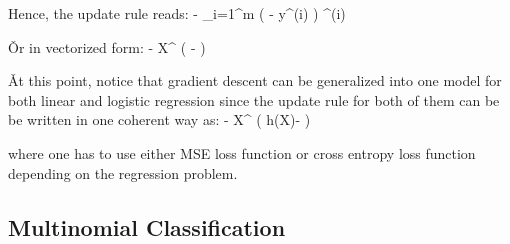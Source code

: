 Hence, the update rule reads:
\bse
{} \coloneqq {} -  \sum_{i=1}^{m}
\Big(  - y^{(i)} \Big) \cdot {}^{(i)}
\ese

\v

Or in vectorized form:
\bse
{} \coloneqq {} -  X^{\intercal}
\Big( - \Big)
\ese

\v

At this point, notice that gradient descent can be generalized into one model for both linear and logistic regression
since the update rule for both of them can be be written in one coherent way as:
\bse
{} \coloneqq {} -  X^{\intercal} \Big( h(X)- \Big)
\ese

where one has to use either MSE loss function or cross entropy loss function depending on the regression problem.

\subsection{Multinomial Classification}

